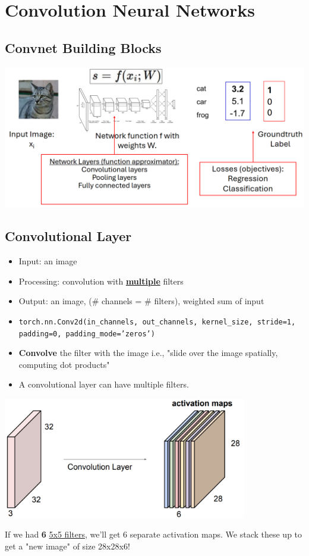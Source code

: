 \documentclass[10pt]{article}
\begin{document}
\pagebreak
\section*{Convolution Neural Networks}
\subsection*{Convnet Building Blocks}
\begin{center} 
	\includegraphics*[width=\textwidth]{L2_17.png} 
\end{center}

\subsection*{Convolutional Layer}
\begin{itemize}
	\item Input: an image
	\item Processing: convolution with \textbf{\underline{multiple}} filters
	\item Output: an image, ($\#$ channels = $\#$ filters), weighted sum of input
	\item \texttt{torch.nn.Conv2d(in\_channels, out\_channels, kernel\_size, stride=1, } \\\texttt{padding=0, padding\_mode='zeros')}
	\item \textbf{Convolve} the filter with the image i.e., "slide over the image spatially, computing dot products"
	\item A convolutional layer can have multiple filters.
\end{itemize}
\begin{center} 
	\includegraphics*[width=0.8\textwidth]{L2_18.png} 
\end{center}
If we had \textbf{6} \underline{5x5 filters}, we'll get 6 separate activation maps.  We stack these up to get a "new image" of size 28x28x6!
\end{document}
